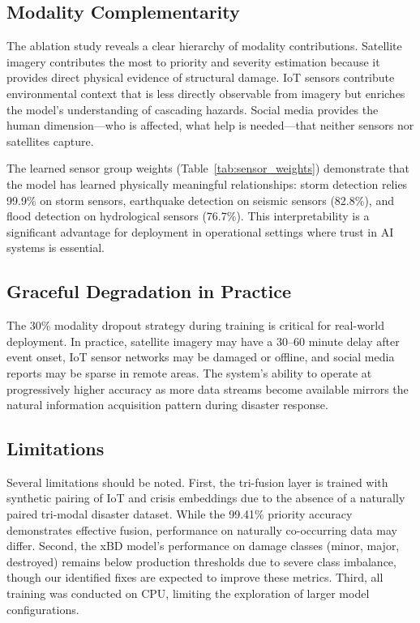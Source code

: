 \documentclass[journal]{IEEEtran}
\begin{document}
\subsection{Modality Complementarity}

The ablation study reveals a clear hierarchy of modality contributions. Satellite imagery contributes the most to priority and severity estimation because it provides direct physical evidence of structural damage. IoT sensors contribute environmental context that is less directly observable from imagery but enriches the model's understanding of cascading hazards. Social media provides the human dimension---who is affected, what help is needed---that neither sensors nor satellites capture.

The learned sensor group weights (Table~\ref{tab:sensor_weights}) demonstrate that the model has learned physically meaningful relationships: storm detection relies 99.9\% on storm sensors, earthquake detection on seismic sensors (82.8\%), and flood detection on hydrological sensors (76.7\%). This interpretability is a significant advantage for deployment in operational settings where trust in AI systems is essential.

\subsection{Graceful Degradation in Practice}

The 30\% modality dropout strategy during training is critical for real-world deployment. In practice, satellite imagery may have a 30--60 minute delay after event onset, IoT sensor networks may be damaged or offline, and social media reports may be sparse in remote areas. The system's ability to operate at progressively higher accuracy as more data streams become available mirrors the natural information acquisition pattern during disaster response.

\subsection{Limitations}

Several limitations should be noted. First, the tri-fusion layer is trained with synthetic pairing of IoT and crisis embeddings due to the absence of a naturally paired tri-modal disaster dataset. While the 99.41\% priority accuracy demonstrates effective fusion, performance on naturally co-occurring data may differ. Second, the xBD model's performance on damage classes (minor, major, destroyed) remains below production thresholds due to severe class imbalance, though our identified fixes are expected to improve these metrics. Third, all training was conducted on CPU, limiting the exploration of larger model configurations.
\end{document}
